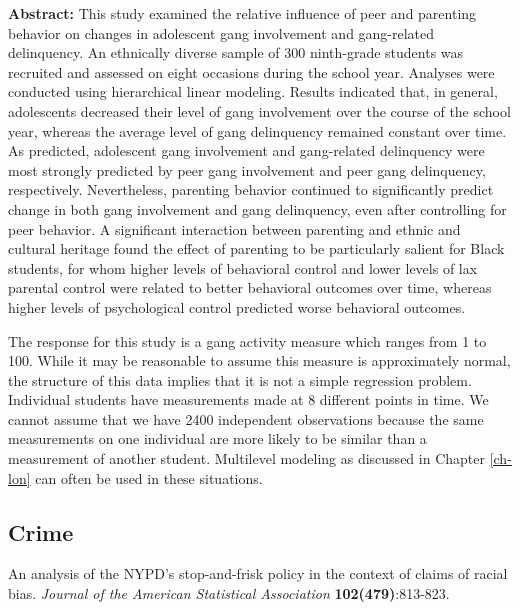 \documentclass[
]{krantz}
\renewenvironment{quote}{\begin{VF}}{\end{VF}}
\begin{document}
\begin{quote}
\textbf{Abstract:} This study examined the relative influence of peer and parenting behavior on changes in adolescent gang involvement and gang-related delinquency. An ethnically diverse sample of 300 ninth-grade students was recruited and assessed on eight occasions during the school year. Analyses were conducted using hierarchical linear modeling. Results indicated that, in general, adolescents decreased their level of gang involvement over the course of the school year, whereas the average level of gang delinquency remained constant over time. As predicted, adolescent gang involvement and gang-related delinquency were most strongly predicted by peer gang involvement and peer gang delinquency, respectively. Nevertheless, parenting behavior continued to significantly predict change in both gang involvement and gang delinquency, even after controlling for peer behavior. A significant interaction between parenting and ethnic and cultural heritage found the effect of parenting to be particularly salient for Black students, for whom higher levels of behavioral control and lower levels of lax parental control were related to better behavioral outcomes over time, whereas higher levels of psychological control predicted worse behavioral outcomes.
\end{quote}

The response for this study is a gang activity measure which ranges from 1 to 100. While it may be reasonable to assume this measure is approximately normal, the structure of this data implies that it is not a simple regression problem. Individual students have measurements made at 8 different points in time. We cannot assume that we have 2400 independent observations because the same measurements on one individual are more likely to be similar than a measurement of another student. Multilevel modeling as discussed in Chapter \ref{ch-lon} can often be used in these situations.

\subsection{Crime}\label{crime}

\citet{Gelman2007} An analysis of the NYPD's stop-and-frisk policy in the context of claims of racial bias. \emph{Journal of the American Statistical Association} \textbf{102(479)}:813-823.
\end{document}
